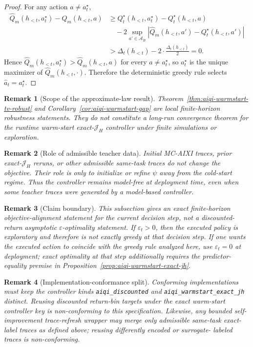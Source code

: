 \documentclass[11pt]{article}
\newtheorem{remark}{Remark}
\begin{document}
\begin{proof}
For any action $a\neq a_t^\star$,
\[
\begin{aligned}
\widehat Q_m(h_{<t},a_t^\star)-\widehat Q_m(h_{<t},a)
&\ge
Q_t^\star(h_{<t},a_t^\star)-Q_t^\star(h_{<t},a)\\
&\quad-
2\sup_{a'\in\mathcal{A}_B}
\left|
\widehat Q_m(h_{<t},a')-Q_t^\star(h_{<t},a')
\right|\\
&>
\Delta_t(h_{<t})-2\cdot\frac{\Delta_t(h_{<t})}{2}
=0.
\end{aligned}
\]
Hence $\widehat Q_m(h_{<t},a_t^\star)>\widehat Q_m(h_{<t},a)$ for every
$a\neq a_t^\star$, so $a_t^\star$ is the unique maximizer of
$\widehat Q_m(h_{<t},\cdot)$. Therefore the deterministic greedy rule selects
$\hat a_t=a_t^\star$.
\end{proof}

\begin{remark}[Scope of the approximate-law result]
Theorem~\ref{thm:aiqi-warmstart-tv-robust} and
Corollary~\ref{cor:aiqi-warmstart-gap} are local finite-horizon robustness
statements. They do not constitute a long-run convergence theorem for the
runtime warm-start exact-$\mathcal{J}_H$ controller under finite simulations or
exploration.
\end{remark}

\begin{remark}[Role of admissible teacher data]
Initial MC-AIXI traces, prior exact-$\mathcal{J}_H$ reruns, or other
admissible same-task traces do not change the objective. Their role is only to
initialize or refine $\psi$ away from the cold-start regime. Thus the
controller remains model-free at deployment time, even when some teacher traces
were generated by a model-based controller.
\end{remark}

\begin{remark}[Claim boundary]
This subsection gives an exact finite-horizon objective-alignment statement for
the current decision step, not a discounted-return asymptotic
$\varepsilon$-optimality statement. If $\varepsilon_t>0$, then the executed
policy is exploratory and therefore is not exactly greedy at that decision
step. If one wants the executed action to coincide with the greedy rule
analyzed here, use $\varepsilon_t=0$ at deployment; exact optimality at that
step additionally requires the predictor-equality premise in
Proposition~\ref{prop:aiqi-warmstart-exact-jh}.
\end{remark}

\begin{remark}[Implementation-conformance split]
Conforming implementations must keep the controller kinds
\texttt{aiqi\_discounted} and \texttt{aiqi\_warmstart\_exact\allowbreak\_jh}
distinct. Reusing discounted return-bin targets under the exact warm-start
controller key is non-conforming to this specification. Likewise, any bounded
self-improvement trace-refresh wrapper may merge only admissible same-task
exact-label traces as defined above; reusing differently encoded or surrogate-
labeled traces is non-conforming.
\end{remark}
\end{document}
